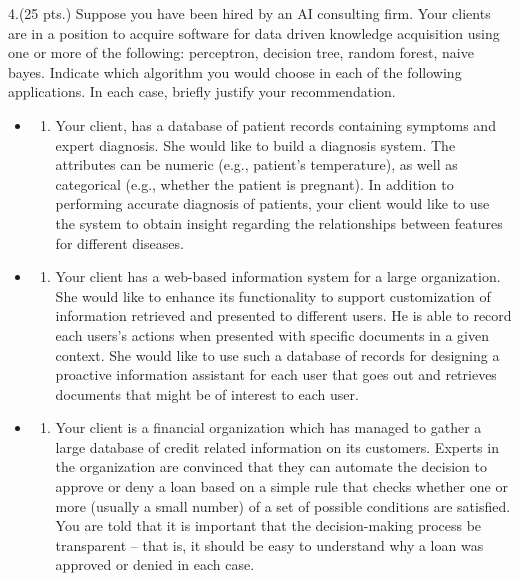 \documentclass[11pt]{article}
\providecommand{\tightlist}{%
      \setlength{\itemsep}{0pt}\setlength{\parskip}{0pt}}
\begin{document}
    4.(25 pts.) Suppose you have been hired by an AI consulting firm. Your
clients are in a position to acquire software for data driven knowledge
acquisition using one or more of the following: perceptron, decision
tree, random forest, naive bayes. Indicate which algorithm you would
choose in each of the following applications. In each case, briefly
justify your recommendation.

    \begin{itemize}
\item
  \begin{enumerate}
  \def\labelenumi{(\alph{enumi})}
  \tightlist
  \item
    Your client, has a database of patient records containing symptoms
    and expert diagnosis. She would like to build a diagnosis system.
    The attributes can be numeric (e.g., patient's temperature), as well
    as categorical (e.g., whether the patient is pregnant). In addition
    to performing accurate diagnosis of patients, your client would like
    to use the system to obtain insight regarding the relationships
    between features for different diseases.
  \end{enumerate}
\item
  \begin{enumerate}
  \def\labelenumi{(\alph{enumi})}
  \setcounter{enumi}{1}
  \tightlist
  \item
    Your client has a web-based information system for a large
    organization. She would like to enhance its functionality to support
    customization of information retrieved and presented to different
    users. He is able to record each users's actions when presented with
    specific documents in a given context. She would like to use such a
    database of records for designing a proactive information assistant
    for each user that goes out and retrieves documents that might be of
    interest to each user.
  \end{enumerate}
\item
  \begin{enumerate}
  \def\labelenumi{(\alph{enumi})}
  \setcounter{enumi}{2}
  \tightlist
  \item
    Your client is a financial organization which has managed to gather
    a large database of credit related information on its customers.
    Experts in the organization are convinced that they can automate the
    decision to approve or deny a loan based on a simple rule that
    checks whether one or more (usually a small number) of a set of
    possible conditions are satisfied. You are told that it is important
    that the decision-making process be transparent -- that is, it
    should be easy to understand why a loan was approved or denied in
    each case.
  \end{enumerate}
\end{itemize}
\end{document}
